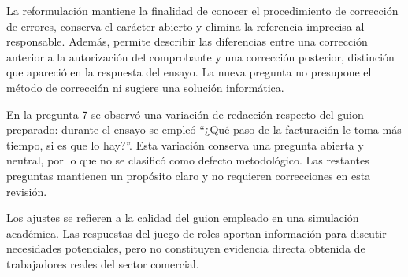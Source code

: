 La reformulación mantiene la finalidad de conocer el procedimiento de corrección de errores, conserva el carácter abierto y elimina la referencia imprecisa al responsable. Además, permite describir las diferencias entre una corrección anterior a la autorización del comprobante y una corrección posterior, distinción que apareció en la respuesta del ensayo. La nueva pregunta no presupone el método de corrección ni sugiere una solución informática.

En la pregunta 7 se observó una variación de redacción respecto del guion preparado: durante el ensayo se empleó ``¿Qué paso de la facturación le toma más tiempo, si es que lo hay?''. Esta variación conserva una pregunta abierta y neutral, por lo que no se clasificó como defecto metodológico. Las restantes preguntas mantienen un propósito claro y no requieren correcciones en esta revisión.

Los ajustes se refieren a la calidad del guion empleado en una simulación académica. Las respuestas del juego de roles aportan información para discutir necesidades potenciales, pero no constituyen evidencia directa obtenida de trabajadores reales del sector comercial.
